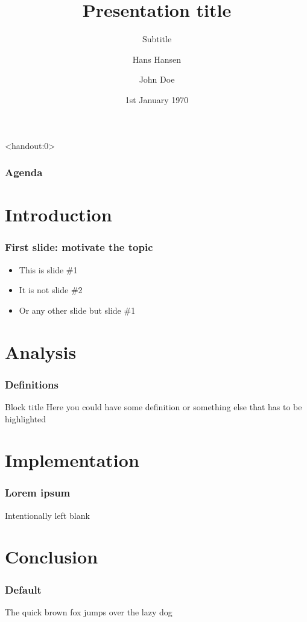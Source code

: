 \documentclass{beamer}
\title{Presentation title}
\subtitle{Subtitle}
\author{Hans Hansen \and John Doe}
\date{1st January 1970}
\institute{Computer Science\\
University of Copenhagen}
\begin{document}
\frame{\titlepage} 

%
\begin{frame}<handout:0>
  \frametitle{Agenda}
  \tableofcontents
\end{frame}

\section{Introduction}
\begin{frame}
  \frametitle{First slide: motivate the topic}

  \begin{itemize}
  \item This is slide \#1
  \item It is not slide \#2
  \item Or any other slide but slide \#1
  \end{itemize}
\end{frame} 


\section{Analysis}
\begin{frame}
  \frametitle{Definitions}
  \begin{block}{Block title}
    Here you could have some definition or something else that has to be highlighted
  \end{block}
\end{frame}

\section{Implementation}
\begin{frame}
  \frametitle{Lorem ipsum}
  Intentionally left blank
\end{frame}


\section{Conclusion}
\begin{frame}
  \frametitle{Default}
  The quick brown fox jumps over the lazy dog
\end{frame}
\end{document}
